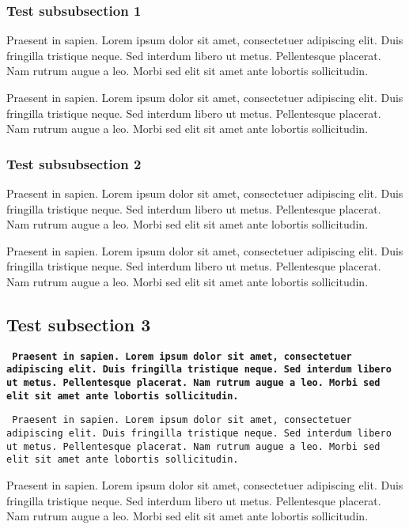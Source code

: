 \subsubsection*{Test subsubsection 1}
Praesent in sapien. Lorem ipsum dolor sit amet, consectetuer adipiscing elit.
Duis fringilla tristique neque. Sed interdum libero ut metus. Pellentesque placerat.
Nam rutrum augue a leo. Morbi sed elit sit amet ante lobortis sollicitudin.

Praesent in sapien. Lorem ipsum dolor sit amet, consectetuer adipiscing elit.
Duis fringilla tristique neque. Sed interdum libero ut metus. Pellentesque placerat.
Nam rutrum augue a leo. Morbi sed elit sit amet ante lobortis sollicitudin.

\subsubsection*{Test subsubsection 2}
Praesent in sapien. Lorem ipsum dolor sit amet, consectetuer adipiscing elit.
Duis fringilla tristique neque. Sed interdum libero ut metus. Pellentesque placerat.
Nam rutrum augue a leo. Morbi sed elit sit amet ante lobortis sollicitudin.

Praesent in sapien. Lorem ipsum dolor sit amet, consectetuer adipiscing elit.
Duis fringilla tristique neque. Sed interdum libero ut metus. Pellentesque placerat.
Nam rutrum augue a leo. Morbi sed elit sit amet ante lobortis sollicitudin.

\subsection*{Test subsection 3}
\texttt{
\textbf{
Praesent in sapien. Lorem ipsum dolor sit amet, consectetuer adipiscing elit.
Duis fringilla tristique neque. Sed interdum libero ut metus. Pellentesque placerat.
Nam rutrum augue a leo. Morbi sed elit sit amet ante lobortis sollicitudin.
}
}

\texttt{
Praesent in sapien. Lorem ipsum dolor sit amet, consectetuer adipiscing elit.
Duis fringilla tristique neque. Sed interdum libero ut metus. Pellentesque placerat.
Nam rutrum augue a leo. Morbi sed elit sit amet ante lobortis sollicitudin.
}

Praesent in sapien. Lorem ipsum dolor sit amet, consectetuer adipiscing elit.
Duis fringilla tristique neque. Sed interdum libero ut metus. Pellentesque placerat.
Nam rutrum augue a leo. Morbi sed elit sit amet ante lobortis sollicitudin.

